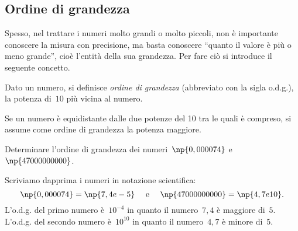 \ovalbox{\risolvii \ref{ese:3.67}, \ref{ese:3.68}, \ref{ese:3.69}, \ref{ese:3.70}, \ref{ese:3.71},
\ref{ese:3.72}, \ref{ese:3.73}, \ref{ese:3.74}}

\subsection{Ordine di grandezza}

Spesso, nel trattare i numeri molto grandi o molto piccoli, non è importante conoscere
la misura con precisione, ma basta conoscere ``quanto il valore è più o meno grande'',
cioè l'entità della sua grandezza. Per fare ciò si introduce il seguente concetto.

\begin{definizione}
Dato un numero, si definisce \emph{ordine di grandezza} (abbreviato con la sigla o.d.g.),
la potenza di~$10$ più vicina al numero.
\end{definizione}

Se un numero è equidistante dalle due potenze del 10 tra le quali è compreso, si assume come ordine di grandezza la potenza maggiore.


\begin{exrig}
 \begin{esempio}
Determinare l'ordine di grandezza dei numeri~$\np{0,000074}$ e~$\np{47000000000}$.

Scriviamo dapprima i numeri in notazione scientifica:
\[\np{0,000074}=\np{7,4e-5}\quad\text{ e }\quad \np{47000000000}=\np{4,7e10}.\]
L'o.d.g. del primo numero è~$10^{-4}$ in quanto il numero~$7,4$ è maggiore di~$5$.
L'o.d.g. del secondo numero è~$10^{10}$ in quanto il numero~$4,7$ è minore di~$5$.
 \end{esempio}
\end{exrig}

\ovalbox{\risolvii \ref{ese:3.75}, \ref{ese:3.76}, \ref{ese:3.77}}

